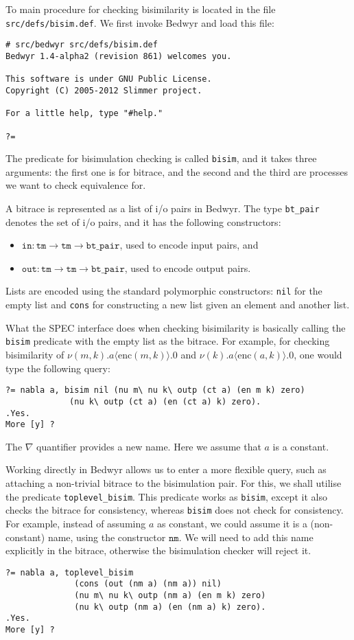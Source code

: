 \documentclass{article}
\newcommand\obj[1]{\texttt{#1}}
\begin{document}
To main procedure for checking bisimilarity is located in the file \obj{src/defs/bisim.def}.
We first invoke Bedwyr and load this file:
\begin{verbatim}
# src/bedwyr src/defs/bisim.def
Bedwyr 1.4-alpha2 (revision 861) welcomes you.

This software is under GNU Public License.
Copyright (C) 2005-2012 Slimmer project.

For a little help, type "#help."

?= 
\end{verbatim}
The predicate for bisimulation checking is called \texttt{bisim}, and it takes three
arguments: the first one is for bitrace, and the second and the third are processes
we want to check equivalence for. 

A bitrace is represented as a list of i/o pairs in Bedwyr. The type \texttt{bt\_pair}
denotes the set of i/o pairs, and it has the following constructors:
\begin{itemize}
\item $\obj{in} : \obj{tm} \to \obj{tm} \to \obj{bt\_pair}$, used to encode input pairs, and
\item $\obj{out} : \obj{tm} \to \obj{tm} \to \obj{bt\_pair}$, used to encode output pairs.
\end{itemize}
Lists are encoded using the standard polymorphic constructors: \obj{nil} for
the empty list and \obj{cons} for constructing a new list given an element and another list.

What the SPEC interface does when checking bisimilarity is basically calling the \obj{bisim}
predicate with the empty list as the bitrace.
For example, for checking bisimilarity of 
$\nu (m,k). a\langle \mathrm{enc}(m,k) \rangle.0$ and 
$\nu (k). a\langle \mathrm{enc}(a,k) \rangle.0$, one would type the following
query:
\begin{verbatim}
?= nabla a, bisim nil (nu m\ nu k\ outp (ct a) (en m k) zero) 
             (nu k\ outp (ct a) (en (ct a) k) zero).
.Yes.
More [y] ? 
\end{verbatim}
The $\nabla$ quantifier provides a new name. Here we assume that $a$ is a constant. 

Working directly in Bedwyr allows us to enter a more flexible query, 
such as attaching a non-trivial bitrace to the bisimulation pair. 
For this, we shall utilise the predicate \obj{toplevel\_bisim}. This predicate
works as \obj{bisim}, except it also checks the bitrace for consistency, whereas
\obj{bisim} does not check for consistency. 
For example, instead of assuming $a$ as constant, we could assume it is
a (non-constant) name, using the constructor $\obj{nm}.$ We will need to add this
name explicitly in the bitrace, otherwise the bisimulation checker will reject it. 
\begin{verbatim}
?= nabla a, toplevel_bisim 
              (cons (out (nm a) (nm a)) nil)  
              (nu m\ nu k\ outp (nm a) (en m k) zero) 
              (nu k\ outp (nm a) (en (nm a) k) zero).
.Yes.
More [y] ?
\end{verbatim}
\end{document}
